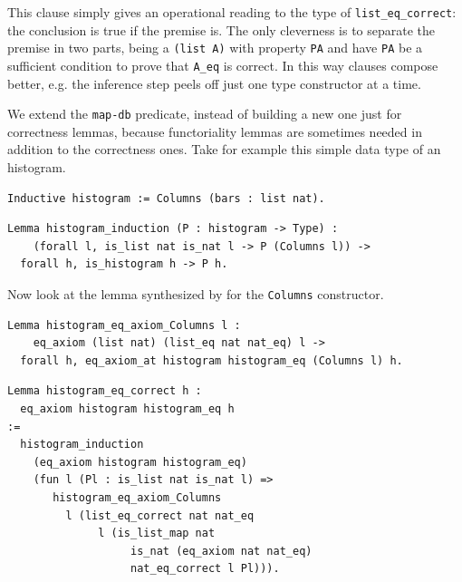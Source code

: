 \documentclass[sigplan,10pt,review]{acmart}\settopmatter{printfolios=true,printccs=false,printacmref=false}
\newcommand{\derive}[1]{\keys{#1}}
\begin{document}
\noindent
This clause simply gives an operational reading to the type
of \lstinline+list_eq_correct+: the conclusion is true if the premise
is. The only cleverness is to separate the premise in two parts,
being a \lstinline+(list A)+ with property \lstinline+PA+ and have
\lstinline+PA+ be a sufficient condition to prove that \lstinline+A_eq+
is correct. In this way clauses compose better, e.g. the
inference step peels off just one type constructor at a time.

We extend the \lstinline+map-db+ predicate, instead of building
a new one just for correctness lemmas, because functoriality lemmas
are sometimes needed in addition to the correctness ones.
Take for example this simple data type of an histogram.

\begin{minipage}{\textwidth}\begin{lstlisting}
Inductive histogram := Columns (bars : list nat).
\end{lstlisting}\end{minipage}

\begin{minipage}{\textwidth}\begin{lstlisting}
Lemma histogram_induction (P : histogram -> Type) :
    (forall l, is_list nat is_nat l -> P (Columns l)) ->
  forall h, is_histogram h -> P h.
\end{lstlisting}\end{minipage}

Now look at the lemma synthesized by \derive{eqK}
for the \lstinline+Columns+ constructor.

\begin{minipage}{\textwidth}\begin{lstlisting}
Lemma histogram_eq_axiom_Columns l :
    eq_axiom (list nat) (list_eq nat nat_eq) l ->
  forall h, eq_axiom_at histogram histogram_eq (Columns l) h.
\end{lstlisting}\end{minipage}

\begin{minipage}{\textwidth}\begin{lstlisting}
Lemma histogram_eq_correct h :
  eq_axiom histogram histogram_eq h
:=
  histogram_induction 
    (eq_axiom histogram histogram_eq)
    (fun l (Pl : is_list nat is_nat l) =>
       histogram_eq_axiom_Columns
         l (list_eq_correct nat nat_eq
              l (is_list_map nat
                   is_nat (eq_axiom nat nat_eq)
                   nat_eq_correct l Pl))).
\end{lstlisting}\end{minipage}
\end{document}
